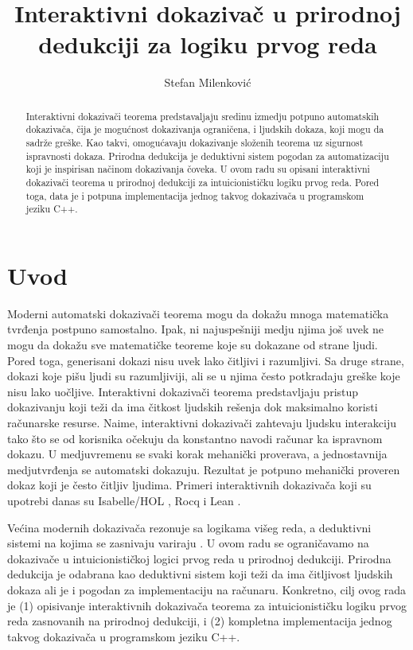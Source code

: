 \documentclass[a4paper,10pt]{article}
\title{Interaktivni dokazivač u prirodnoj dedukciji za logiku prvog reda}
\author{Stefan Milenković}
\theoremstyle{remark}
\begin{document}
\maketitle

\begin{abstract}
    Interaktivni dokazivači teorema predstavaljaju sredinu izmedju potpuno
    automatskih dokazivača, čija je mogućnost dokazivanja ograničena, i ljudskih
    dokaza, koji mogu da sadrže greške.
    Kao takvi, omogućavaju dokazivanje složenih teorema uz sigurnost ispravnosti
    dokaza.
    Prirodna dedukcija je deduktivni sistem pogodan za automatizaciju koji je
    inspirisan načinom dokazivanja čoveka.
    U ovom radu su opisani interaktivni dokazivači teorema u prirodnoj dedukciji
    za intuicionističku logiku prvog reda.
    Pored toga, data je i potpuna implementacija jednog takvog dokazivača u
    programskom jeziku C++.
\end{abstract}

\section{Uvod}

Moderni automatski dokazivači teorema mogu da dokažu mnoga matematička
tvrđenja postpuno samostalno.
Ipak, ni najuspešniji medju njima još uvek ne mogu da dokažu sve matematičke
teoreme koje su dokazane od strane ljudi.
Pored toga, generisani dokazi nisu uvek lako čitljivi i razumljivi.
Sa druge strane, dokazi koje pišu ljudi su razumljiviji, ali se u njima često
potkradaju greške koje nisu lako uočljive.
Interaktivni dokazivači teorema predstavljaju pristup dokazivanju koji teži da
ima čitkost ljudskih rešenja dok maksimalno koristi računarske resurse.
Naime, interaktivni dokazivači zahtevaju ljudsku interakciju tako što se od
korisnika očekuju da konstantno navodi računar ka ispravnom dokazu.
U medjuvremenu se svaki korak mehanički proverava, a jednostavnija
medjutvrđenja se automatski dokazuju.
Rezultat je potpuno mehanički proveren dokaz koji je često čitljiv ljudima.
Primeri interaktivnih dokazivača koji su upotrebi danas su
Isabelle/HOL \cite{nipkow2002isabelle},
Rocq \cite{bertot2013interactive}\cite{rocq2026development} i
Lean \cite{moura2021lean}.

Većina modernih dokazivača rezonuje sa logikama višeg reda, a deduktivni
sistemi na kojima se zasnivaju variraju \cite{maric2015survey}.
U ovom radu se ograničavamo na dokazivače u intuicionističkoj logici prvog reda
u prirodnoj dedukciji.
Prirodna dedukcija je odabrana kao deduktivni sistem koji teži da ima čitljivost
ljudskih dokaza ali je i pogodan za implementaciju na računaru.
Konkretno, cilj ovog rada je (1) opisivanje interaktivnih dokazivača teorema za
intuicionističku logiku prvog reda zasnovanih na prirodnoj dedukciji, i
(2) kompletna implementacija jednog takvog dokazivača u programskom jeziku C++.
\end{document}
